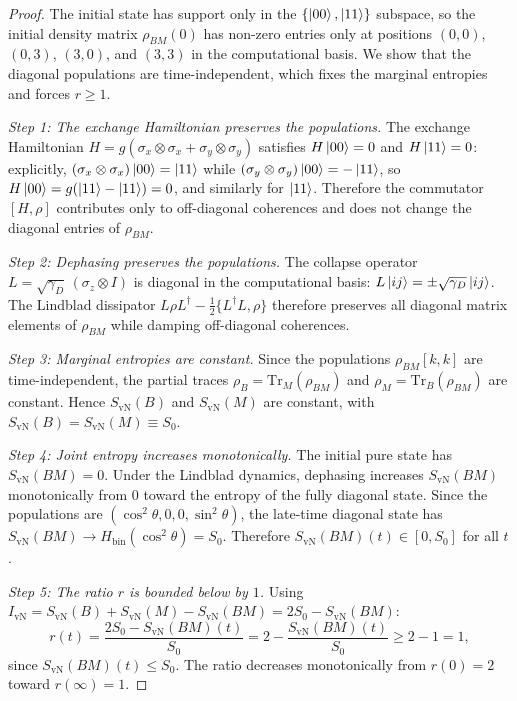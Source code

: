 \documentclass[12pt,a4paper]{article}
\newcommand{\SvN}{S_{\mathrm{vN}}}
\newcommand{\IvN}{I_{\mathrm{vN}}}
\renewcommand{\Tr}{\mathrm{Tr}}
\begin{document}
\begin{proof}
The initial state has support only in the $\{\ket{00},\ket{11}\}$
subspace, so the initial density matrix $\rho_{BM}(0)$ has non-zero
entries only at positions $(0,0)$, $(0,3)$, $(3,0)$, and $(3,3)$ in
the computational basis.  We show that the diagonal populations are
time-independent, which fixes the marginal entropies and forces
$r \ge 1$.

\emph{Step 1: The exchange Hamiltonian preserves the populations.}
The exchange Hamiltonian $H = g(\sigma_x \otimes \sigma_x +
\sigma_y \otimes \sigma_y)$ satisfies $H\ket{00} = 0$ and
$H\ket{11} = 0$: explicitly, $(\sigma_x \otimes \sigma_x)\ket{00}
= \ket{11}$ while $(\sigma_y \otimes \sigma_y)\ket{00} =
-\ket{11}$, so $H\ket{00} = g(\ket{11} - \ket{11}) = 0$, and
similarly for $\ket{11}$.  Therefore the commutator $[H, \rho]$
contributes only to off-diagonal coherences and does not change
the diagonal entries of $\rho_{BM}$.

\emph{Step 2: Dephasing preserves the populations.}
The collapse operator $L = \sqrt{\gamma_D}\,(\sigma_z \otimes I)$
is diagonal in the computational basis: $L\ket{ij} = \pm
\sqrt{\gamma_D}\ket{ij}$.  The Lindblad dissipator $L\rho
L^\dagger - \tfrac{1}{2}\{L^\dagger L, \rho\}$ therefore preserves
all diagonal matrix elements of $\rho_{BM}$ while damping
off-diagonal coherences.

\emph{Step 3: Marginal entropies are constant.}
Since the populations $\rho_{BM}[k,k]$ are time-independent, the
partial traces $\rho_B = \Tr_M(\rho_{BM})$ and $\rho_M =
\Tr_B(\rho_{BM})$ are constant.  Hence $\SvN(B)$ and $\SvN(M)$
are constant, with $\SvN(B) = \SvN(M) \equiv S_0$.

\emph{Step 4: Joint entropy increases monotonically.}
The initial pure state has $\SvN(BM) = 0$.  Under the Lindblad
dynamics, dephasing increases $\SvN(BM)$ monotonically from $0$
toward the entropy of the fully diagonal state.  Since the
populations are $(\cos^2\theta, 0, 0, \sin^2\theta)$, the
late-time diagonal state has $\SvN(BM) \to
H_{\mathrm{bin}}(\cos^2\theta) = S_0$.  Therefore
$\SvN(BM)(t) \in [0, S_0]$ for all $t$.

\emph{Step 5: The ratio $r$ is bounded below by $1$.}
Using $\IvN = \SvN(B) + \SvN(M) - \SvN(BM) = 2S_0 - \SvN(BM)$:
\begin{equation}\label{eq:r-bound}
  r(t) = \frac{2S_0 - \SvN(BM)(t)}{S_0}
       = 2 - \frac{\SvN(BM)(t)}{S_0}
       \ge 2 - 1 = 1,
\end{equation}
since $\SvN(BM)(t) \le S_0$.  The ratio decreases monotonically
from $r(0) = 2$ toward $r(\infty) = 1$.
\end{proof}
\end{document}
